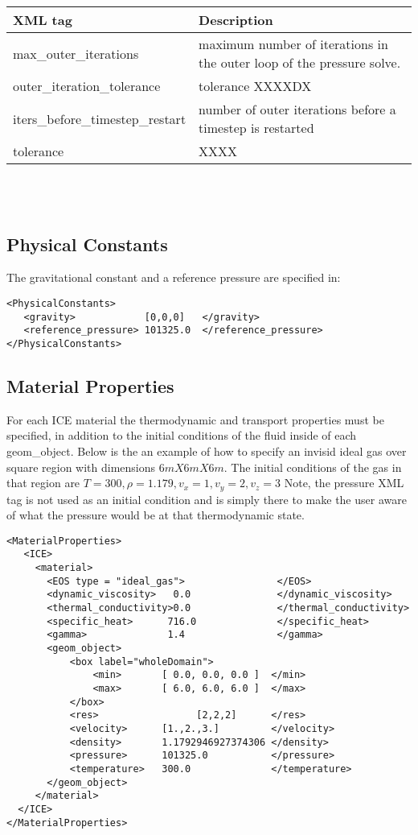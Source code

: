 \noindent
\footnotesize
\begin{tabular}{l p{8cm}}
XML tag &  Description\\
\hline
\hline
max\_outer\_iterations           &  maximum number of iterations in the outer loop of the pressure solve.\\
outer\_iteration\_tolerance      &  tolerance XXXXDX\\
iters\_before\_timestep\_restart &  \footnotesize number of outer iterations before a timestep is restarted\\
tolerance                        &   XXXX\\
\hline
\end{tabular}
\normalsize\\
\\
\subsection{Physical Constants}
The gravitational constant and a reference pressure are specified in:
\begin{Verbatim}[fontsize=\footnotesize]
<PhysicalConstants>
   <gravity>            [0,0,0]   </gravity>
   <reference_pressure> 101325.0  </reference_pressure>
</PhysicalConstants>
\end{Verbatim}
%
\subsection{Material Properties} \label{sec:ICEmat_props}
For each ICE material the thermodynamic and transport properties must be
specified, in addition to the initial conditions of the fluid inside of
each geom\_object.  Below is the an example of how to specify an invisid
ideal gas over square region with dimensions $6m X 6m X 6m$.  The initial
conditions of the gas in that region are $T=300, \rho=1.179, v_x=1,v_y=2,
v_z=3$ \big{(}Note, the pressure XML tag is not used as an initial condition
and is simply there to make the user aware of what the pressure would be at
that thermodynamic state.\big{)}
%
\begin{Verbatim}[fontsize=\footnotesize]
<MaterialProperties>
   <ICE>
     <material>
       <EOS type = "ideal_gas">                </EOS>
       <dynamic_viscosity>   0.0               </dynamic_viscosity>
       <thermal_conductivity>0.0               </thermal_conductivity>
       <specific_heat>      716.0              </specific_heat>
       <gamma>              1.4                </gamma>
       <geom_object>
           <box label="wholeDomain">
               <min>       [ 0.0, 0.0, 0.0 ]  </min>
               <max>       [ 6.0, 6.0, 6.0 ]  </max>
           </box>
           <res>                 [2,2,2]      </res>
           <velocity>      [1.,2.,3.]         </velocity>
           <density>       1.1792946927374306 </density>
           <pressure>      101325.0           </pressure>     
           <temperature>   300.0              </temperature>
       </geom_object>
     </material>
  </ICE>       
</MaterialProperties>
\end{Verbatim}
